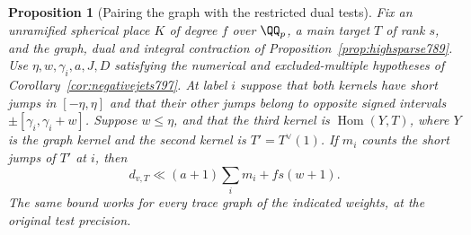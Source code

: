 \documentclass[a4paper,11pt]{article}
\newtheorem{proposition}{Proposition}[section]
\theoremstyle{definition}
\theoremstyle{remark}
\numberwithin{equation}{section}
\begin{document}
\begin{proposition}[Pairing the graph with the restricted dual tests]
\leavevmode\label{prop:windowpair798}
Fix an unramified spherical place \(K\) of degree \(f\) over
\(\QQ_p\), a main target \(T\) of rank \(s\), and the graph,
dual and integral contraction of Proposition~\ref{prop:highsparse789}.
Use \(\eta,w,\gamma_i,a,J,D\) satisfying the numerical and
excluded-multiple hypotheses of Corollary~\ref{cor:negativejets797}.
At label \(i\) suppose that both kernels have short jumps in
\([-\eta,\eta]\) and that their other jumps belong to opposite
signed intervals \(\pm[\gamma_i,\gamma_i+w]\). Suppose
\(w\le\eta\), and that the third kernel is
\(\operatorname{Hom}(Y,T)\), where \(Y\) is the graph kernel
and the second kernel is \(T'=T^\vee(1)\). If \(m_i\) counts
the short jumps of \(T'\) at \(i\), then
\[
              d_{v,T}\ll (a+1)\sum_i m_i+fs(w+1).
\]
The same bound works for every trace graph of the indicated
weights, at the original test precision.
\end{proposition}
\end{document}
